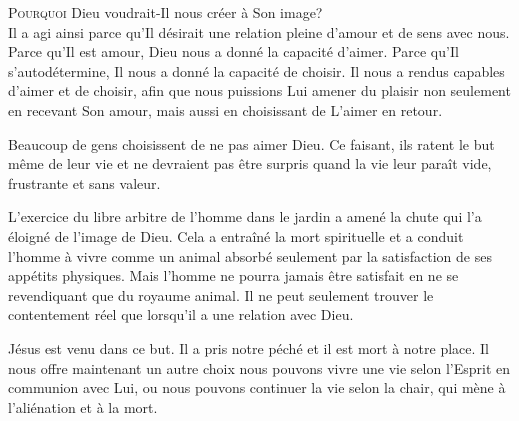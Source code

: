 \jrnlmonth






\lettrine{P}{ourquoi} Dieu voudrait-Il nous créer à Son image? \\[1ex]
Il a agi ainsi parce qu'Il désirait une relation pleine d'amour et de sens avec
 nous. Parce qu'Il est amour, Dieu nous a donné la capacité d'aimer. Parce qu'Il
 s'autodétermine, Il nous a donné la capacité de choisir. Il nous a rendus
 capables d'aimer et de choisir, afin que nous puissions Lui amener du plaisir
 \ocadr{}non seulement en recevant Son amour, mais aussi en choisissant de L'aimer
 en retour. 

Beaucoup de gens choisissent de ne pas aimer Dieu. Ce faisant, ils ratent le but
 même de leur vie et ne devraient pas être surpris quand la vie leur paraît vide,
 frustrante et sans valeur.


L'exercice du libre arbitre de l'homme dans le jardin a amené la chute qui l'a
 éloigné de l'image de Dieu. Cela a entraîné la mort spirituelle et a conduit
 l'homme à vivre comme un animal \ocadr{}absorbé seulement par la satisfaction de ses
 appétits physiques. Mais l'homme ne pourra jamais être satisfait en ne se
 revendiquant que du royaume animal. Il ne peut seulement trouver le contentement
 réel que lorsqu'il a une relation avec Dieu. 

Jésus est venu dans ce but. Il a pris notre péché et il est mort à notre place.
 Il nous offre maintenant un autre choix \ocadr{}nous pouvons vivre une vie selon
 l'Esprit en communion avec Lui, ou nous pouvons continuer la vie selon la chair,
 qui mène à l'aliénation et à la mort. 

